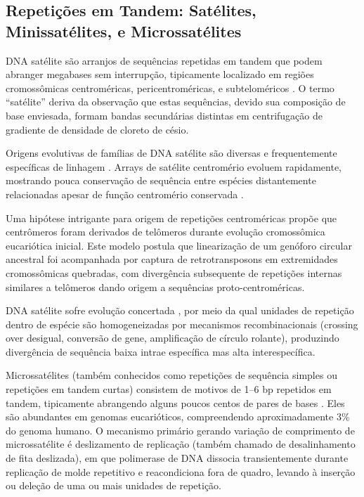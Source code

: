 \subsection{Repetições em Tandem: Satélites, Minissatélites, e Microssatélites}

DNA satélite são arranjos de sequências repetidas em tandem que podem abranger megabases sem interrupção, tipicamente localizado em regiões cromossômicas centroméricas, pericentroméricas, e subteloméricos \parencite{garrido-ramos2017}. O termo ``satélite'' deriva da observação que estas sequências, devido sua composição de base enviesada, formam bandas secundárias distintas em centrifugação de gradiente de densidade de cloreto de césio.

Origens evolutivas de famílias de DNA satélite são diversas e frequentemente específicas de linhagem \parencite{plohl2012}. Arrays de satélite centromério evoluem rapidamente, mostrando pouca conservação de sequência entre espécies distantemente relacionadas apesar de função centromério conservada \parencite{henikoff2001,malik2009}.

Uma hipótese intrigante para origem de repetições centroméricas propõe que centrômeros foram derivados de telômeros durante evolução cromossômica eucariótica inicial. Este modelo postula que linearização de um genóforo circular ancestral foi acompanhada por captura de retrotransposons em extremidades cromossômicas quebradas, com divergência subsequente de repetições internas similares a telômeros dando origem a sequências proto-centroméricas.

DNA satélite sofre evolução concertada \parencite{dover1982}, por meio da qual unidades de repetição dentro de espécie são homogeneizadas por mecanismos recombinacionais (crossing over desigual, conversão de gene, amplificação de círculo rolante), produzindo divergência de sequência baixa intrae específica mas alta interespecífica.

Microssatélites (também conhecidos como repetições de sequência simples ou repetições em tandem curtas) consistem de motivos de 1--6 bp repetidos em tandem, tipicamente abrangendo alguns poucos centos de pares de bases \parencite{ellegren2004}. Eles são abundantes em genomas eucarióticos, compreendendo aproximadamente 3\% do genoma humano. O mecanismo primário gerando variação de comprimento de microssatélite é deslizamento de replicação (também chamado de desalinhamento de fita deslizada), em que polimerase de DNA dissocia transientemente durante replicação de molde repetitivo e reacondiciona fora de quadro, levando à inserção ou deleção de uma ou mais unidades de repetição.


